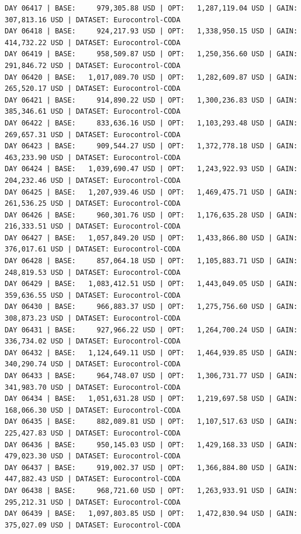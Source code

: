 \documentclass[11pt,a4paper]{article}
\begin{document}
\begin{verbatim}
DAY 06417 | BASE:     979,305.88 USD | OPT:   1,287,119.04 USD | GAIN: 307,813.16 USD | DATASET: Eurocontrol-CODA
DAY 06418 | BASE:     924,217.93 USD | OPT:   1,338,950.15 USD | GAIN: 414,732.22 USD | DATASET: Eurocontrol-CODA
DAY 06419 | BASE:     958,509.87 USD | OPT:   1,250,356.60 USD | GAIN: 291,846.72 USD | DATASET: Eurocontrol-CODA
DAY 06420 | BASE:   1,017,089.70 USD | OPT:   1,282,609.87 USD | GAIN: 265,520.17 USD | DATASET: Eurocontrol-CODA
DAY 06421 | BASE:     914,890.22 USD | OPT:   1,300,236.83 USD | GAIN: 385,346.61 USD | DATASET: Eurocontrol-CODA
DAY 06422 | BASE:     833,636.16 USD | OPT:   1,103,293.48 USD | GAIN: 269,657.31 USD | DATASET: Eurocontrol-CODA
DAY 06423 | BASE:     909,544.27 USD | OPT:   1,372,778.18 USD | GAIN: 463,233.90 USD | DATASET: Eurocontrol-CODA
DAY 06424 | BASE:   1,039,690.47 USD | OPT:   1,243,922.93 USD | GAIN: 204,232.46 USD | DATASET: Eurocontrol-CODA
DAY 06425 | BASE:   1,207,939.46 USD | OPT:   1,469,475.71 USD | GAIN: 261,536.25 USD | DATASET: Eurocontrol-CODA
DAY 06426 | BASE:     960,301.76 USD | OPT:   1,176,635.28 USD | GAIN: 216,333.51 USD | DATASET: Eurocontrol-CODA
DAY 06427 | BASE:   1,057,849.20 USD | OPT:   1,433,866.80 USD | GAIN: 376,017.61 USD | DATASET: Eurocontrol-CODA
DAY 06428 | BASE:     857,064.18 USD | OPT:   1,105,883.71 USD | GAIN: 248,819.53 USD | DATASET: Eurocontrol-CODA
DAY 06429 | BASE:   1,083,412.51 USD | OPT:   1,443,049.05 USD | GAIN: 359,636.55 USD | DATASET: Eurocontrol-CODA
DAY 06430 | BASE:     966,883.37 USD | OPT:   1,275,756.60 USD | GAIN: 308,873.23 USD | DATASET: Eurocontrol-CODA
DAY 06431 | BASE:     927,966.22 USD | OPT:   1,264,700.24 USD | GAIN: 336,734.02 USD | DATASET: Eurocontrol-CODA
DAY 06432 | BASE:   1,124,649.11 USD | OPT:   1,464,939.85 USD | GAIN: 340,290.74 USD | DATASET: Eurocontrol-CODA
DAY 06433 | BASE:     964,748.07 USD | OPT:   1,306,731.77 USD | GAIN: 341,983.70 USD | DATASET: Eurocontrol-CODA
DAY 06434 | BASE:   1,051,631.28 USD | OPT:   1,219,697.58 USD | GAIN: 168,066.30 USD | DATASET: Eurocontrol-CODA
DAY 06435 | BASE:     882,089.81 USD | OPT:   1,107,517.63 USD | GAIN: 225,427.83 USD | DATASET: Eurocontrol-CODA
DAY 06436 | BASE:     950,145.03 USD | OPT:   1,429,168.33 USD | GAIN: 479,023.30 USD | DATASET: Eurocontrol-CODA
DAY 06437 | BASE:     919,002.37 USD | OPT:   1,366,884.80 USD | GAIN: 447,882.43 USD | DATASET: Eurocontrol-CODA
DAY 06438 | BASE:     968,721.60 USD | OPT:   1,263,933.91 USD | GAIN: 295,212.31 USD | DATASET: Eurocontrol-CODA
DAY 06439 | BASE:   1,097,803.85 USD | OPT:   1,472,830.94 USD | GAIN: 375,027.09 USD | DATASET: Eurocontrol-CODA

\end{verbatim}
\end{document}
